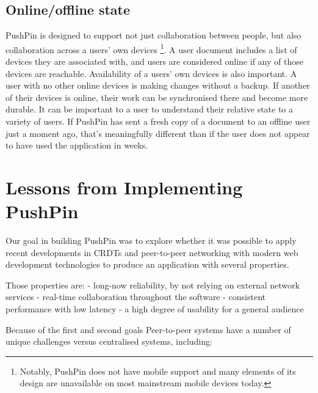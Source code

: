 \documentclass[sigplan,10pt]{acmart}
\begin{document}
\subsection{Online/offline state}

PushPin is designed to support not just collaboration between people, but also collaboration across a users' own devices \footnote{Notably, PushPin does not have mobile support and many elements of its design are unavailable on most mainstream mobile devices today.}. A user document includes a list of devices they are associated with, and users are considered online if any of those devices are reachable. Availability of a users' own devices is also important. A user with no other online devices is making changes without a backup. If another of their devices is online, their work can be synchronised there and become more durable. It can be important to a user to understand their relative state to a variety of users. If PushPin has sent a fresh copy of a document to an offline user just a moment ago, that's meaningfully different than if the user does not appear to have used the application in weeks. 

\section{Lessons from Implementing PushPin}\label{sec:lessons}

Our goal in building PushPin was to explore whether it was possible to apply recent developments in CRDTs and peer-to-peer networking with modern web development technologies to produce an application with several properties.

Those properties are:
 - long-now reliability, by not relying on external network services
 - real-time collaboration throughout the software
 - consistent performance with low latency
 - a high degree of usability for a general audience 

Because of the first and second goals Peer-to-peer systems have a number of unique challenges versus centralised systems, including:
\end{document}
